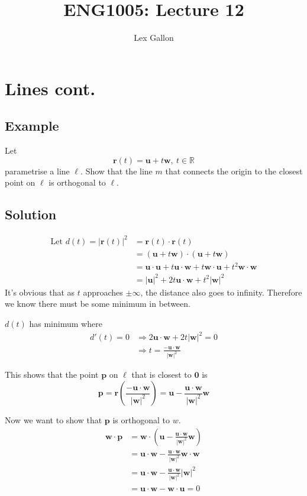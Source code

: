\documentclass[11pt]{article}
\newcommand{\reals}{\mathbb{R}}
\renewcommand{\vec}[1]{\mathbf{#1}}
\begin{document}
\title{ENG1005: Lecture 12}
\author{Lex Gallon}
\maketitle

\tableofcontents

\section{Lines cont.}
\subsection{Example}
Let 
\[ \vec{r}(t) = \vec{u} + t\vec{w},\ t \in \reals \]
parametrise a line $\ell$. Show that the line $m$ that connects the origin to the closest point on $\ell$ is orthogonal to $\ell$.

\subsection{Solution}
\begin{align*}
\text{Let } d(t) = |\vec{r}(t)|^2 &= \vec{r}(t) \cdot \vec{r}(t) \\
&= (\vec{u} + t\vec{w}) \cdot (\vec{u} + t\vec{w}) \\
&= \vec{u} \cdot \vec{u} + t\vec{u} \cdot \vec{w} + t\vec{w} \cdot \vec{u} + t^2\vec{w} \cdot \vec{w} \\
&= |\vec{u}|^2 + 2t\vec{u}\cdot \vec{w} + t^2|\vec{w}|^2
\end{align*}
It's obvious that as $t$ approaches $\pm \infty$, the distance also goes to infinity. Therefore we know there must be some minimum in between.

$d(t)$ has minimum where
\begin{align*}
d'(t) = 0 &\Rightarrow 2 \vec{u} \cdot \vec{w} + 2 t |\vec{w}|^2 = 0 \\
&\Rightarrow t = \frac{-\vec{u} \cdot \vec{w}}{|\vec{w}|^2}
\end{align*}

This shows that the point $\vec{p}$ on $\ell$ that is closest to $\vec{0}$ is
\[ \vec{p} = \vec{r} \left( \frac{-\vec{u} \cdot \vec{w}}{|\vec{w}|^2} \right) = \vec{u} - \frac{\vec{u} \cdot \vec{w}}{|\vec{w}|^2} \vec{w} \]

Now we want to show that $\vec{p}$ is orthogonal to $w$. 
\begin{align*}
\vec{w} \cdot \vec{p} &= \vec{w} \cdot \left( \vec{u} - \frac{\vec{u} \cdot \vec{w}}{|\vec{w}|^2} \vec{w} \right) \\
&= \vec{u} \cdot \vec{w} - \frac{\vec{u} \cdot \vec{w}}{|\vec{w}|^2} \vec{w} \cdot \vec{w} \\
&= \vec{u} \cdot \vec{w} - \frac{\vec{u} \cdot \vec{w}}{|\vec{w}|^2} |\vec{w}|^2 \\
&= \vec{u} \cdot \vec{w} - \vec{w} \cdot \vec{u} = 0
\end{align*}
\end{document}
